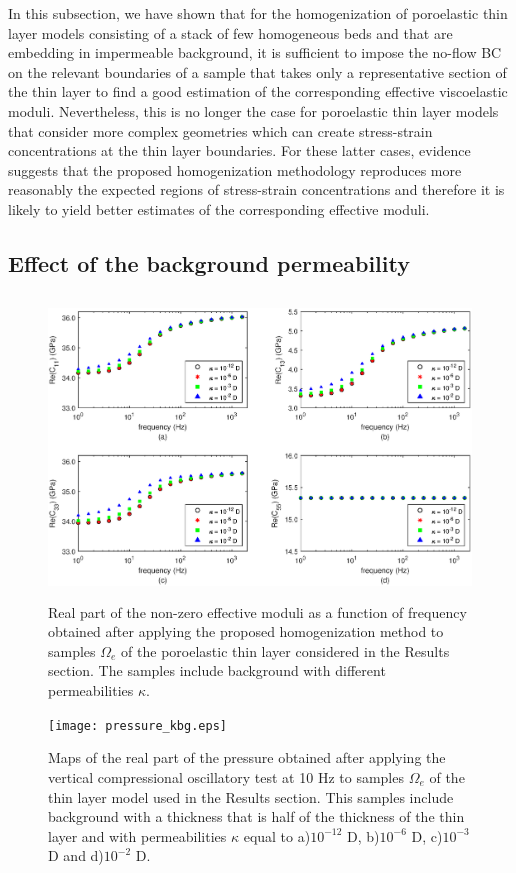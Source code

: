 \documentclass[draft]{agujournal2019}
\begin{document}
In this subsection, we have shown that for the homogenization of poroelastic thin layer models consisting of a stack of few homogeneous beds and that are embedding in impermeable background, it is sufficient to impose the no-flow BC on the relevant boundaries of a sample that takes only a representative section of the thin layer to find a good estimation of the corresponding effective viscoelastic moduli. Nevertheless, this is no longer the case for poroelastic thin layer models that consider more complex geometries which can create stress-strain concentrations at the thin layer boundaries. For these latter cases, evidence suggests that the proposed homogenization methodology reproduces more reasonably the expected regions of  stress-strain concentrations and therefore it is likely to yield better estimates of the corresponding effective moduli.

\subsection{Effect of the background permeability}

\begin{figure}[!ht]
\centering
        \includegraphics[width= 120mm, height=80mm]{cijkbg_2sandshale.eps}
\caption{Real part of the non-zero effective moduli as a function of frequency obtained after applying the proposed homogenization method to samples $\Omega_e$ of the poroelastic thin layer considered in the Results section. The samples include background with different permeabilities $\kappa$.}
\label{fig.11}
\end{figure}

\begin{figure}[!ht]
\centering
        \texttt{[image: pressure\_kbg.eps]}
\caption{Maps of the real part of the pressure obtained after applying the vertical compressional oscillatory test at 10 Hz to samples $\Omega_e$ of the thin layer model used in the Results section. This samples include background with a thickness that is half of the thickness of the thin layer and with permeabilities $\kappa$ equal to a)$10^{-12}$ D, b)$10^{-6}$ D, c)$10^{-3}$ D and d)$10^{-2}$ D. }
\label{fig.12}
\end{figure}
\end{document}
